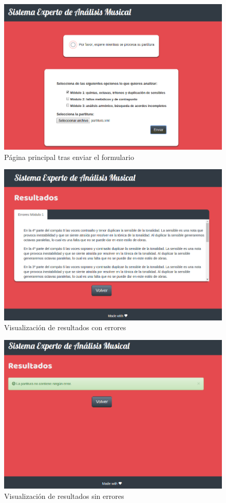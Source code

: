 \begin{figure}[H]
	\centering
	\includegraphics[scale=0.35]{imagenes/interfaz4.png}
	\caption{Página principal tras enviar el formulario}
	\label{fig5.3.2}
\end{figure}

\bigskip

\begin{figure}[H]
	\centering
	\includegraphics[scale=0.35]{imagenes/interfaz5.png}
	\caption{Visualización de resultados con errores}
	\label{fig5.3.3}
\end{figure}

\begin{figure}[H]
	\centering
	\includegraphics[scale=0.35]{imagenes/interfaz6.png}
	\caption{Visualización de resultados sin errores}
	\label{fig5.3.4}
\end{figure}